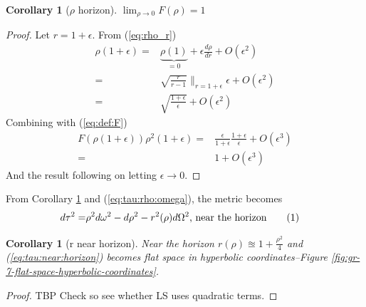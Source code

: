 \documentclass[]{article}
\newcommand\numberthis{\addtocounter{equation}{1}\tag{\theequation}}
\newtheorem{cor}[thm]{Corollary}
\begin{document}
{\begin{cor}[$\rho$ horizon]\label{cor:rho:horizon}
	$\lim_{\rho \rightarrow 0}F(\rho) =1$
\end{cor}
\begin{proof}
	Let $r=1+\epsilon$. From (\ref{eq:rho_r})
	\begin{align*}
		\rho(1+\epsilon) =& \underbrace{\rho(1)}_\text{$=0$} + \epsilon \frac{d\rho}{dr} + O(\epsilon^2) \\
		=& \sqrt{\frac{r}{r-1}}\rVert_{r=1+\epsilon} \epsilon + O(\epsilon^2) \\
		=& \sqrt{\frac{1+\epsilon}{\epsilon}} + O(\epsilon^2) 
	\end{align*}
	Combining with (\ref{eq:def:F})	
	\begin{align*}
		F(\rho(1+\epsilon))\rho^2(1+\epsilon)=&\frac{\epsilon}{1+\epsilon}\frac{1+\epsilon}{\epsilon} + O(\epsilon^3)\\
		=& 1  + O(\epsilon^3)
	\end{align*}
	And the result following on letting $\epsilon \rightarrow 0$.
\end{proof}

From Corollary \ref{cor:rho:horizon} and (\ref{eq:tau:rho:omega}), the metric becomes 
\begin{align*}
	d\tau^2 =&  \rho^2 d\omega^2 - d\rho^2 -r^2(\rho) d\Omega^2 \text{, near the horizon} \numberthis \label{eq:tau:near:horizon}
\end{align*}

\begin{cor}[r near horizon]
	Near the horizon $r(\rho) \approxeq 1 + \frac{\rho^2}{4}$ and (\ref{eq:tau:near:horizon}) becomes flat space in hyperbolic coordinates--Figure \ref{fig:gr-7-flat-space-hyperbolic-coordinates}.
\end{cor}

\begin{proof}
	TBP
	Check so see whether LS uses quadratic terms. 
\end{proof}

}
\end{document}
